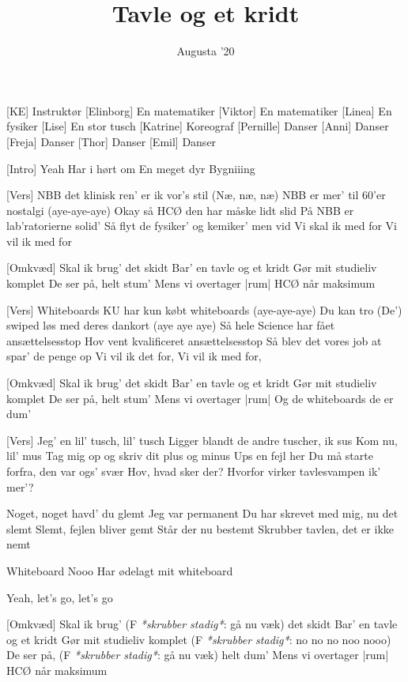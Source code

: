 \documentclass[a4paper, 11pt]{article}
\title{Tavle og et kridt}
\author{Augusta '20}
\begin{document}
\maketitle

\begin{roles}  
[KE] Instruktør
[Elinborg] En matematiker
[Viktor] En matematiker
[Linea] En fysiker
[Lise] En stor tusch
[Katrine] Koreograf
[Pernille] Danser
[Anni] Danser
[Freja] Danser
[Thor] Danser
[Emil] Danser
\end{roles}

\begin{song}

[Intro] Yeah
Har i hørt om 
En meget dyr
Bygniiing



[Vers] NBB
det klinisk ren’ er ik vor’s stil (Næ, næ, næ) 
NBB
er mer' til 60'er nostalgi (aye-aye-aye)
Okay så HCØ den har måske lidt slid
På NBB er lab’ratorierne solid’
Så flyt de fysiker’ og kemiker’ men vid
Vi skal ik med for
Vi vil ik med for 

[Omkvæd] Skal ik brug’ det skidt 
Bar’ en tavle og et kridt 
Gør mit studieliv komplet 
De ser på, helt stum’
Mens vi overtager |rum|
HCØ når maksimum

[Vers] Whiteboards
KU har kun købt whiteboards (aye-aye-aye)
Du kan tro 
(De') swiped løs med deres dankort (aye aye aye)
Så hele Science har fået ansættelsesstop
Hov vent kvalificeret ansættelsesstop
Så blev det vores job at spar’ de penge op
Vi vil ik det for,
Vi vil ik med for,

[Omkvæd] Skal ik brug’ det skidt 
Bar’ en tavle og et kridt 
Gør mit studieliv komplet 
De ser på, helt stum’
Mens vi overtager |rum|
Og de whiteboards de er dum'

[Vers] Jeg’ en lil' tusch, lil' tusch
Ligger blandt de andre tuscher, ik sus
Kom nu, lil' mus 
Tag mig op og skriv dit plus og minus 
Ups en fejl her
Du må starte forfra, den var ogs' svær
Hov, hvad sker der? 
Hvorfor virker tavlesvampen ik' mer'?

Noget, noget havd’ du glemt 
Jeg var permanent
Du har skrevet med mig, nu det slemt
Slemt, fejlen bliver gemt 
Står der nu bestemt  
Skrubber tavlen, det er ikke nemt

 Whiteboard
Nooo 
Har ødelagt mit whiteboard 

 Yeah, let's go, let's go

[Omkvæd] Skal ik brug’ (F \textit{*skrubber stadig*}: gå nu væk) det skidt 
Bar’ en tavle og et kridt 
Gør mit studieliv komplet (F \textit{*skrubber stadig*}: no no no noo nooo)
De ser på, (F \textit{*skrubber stadig*}: gå nu væk) helt dum’
Mens vi overtager |rum|
HCØ når maksimum


\end{song}
\end{document}
